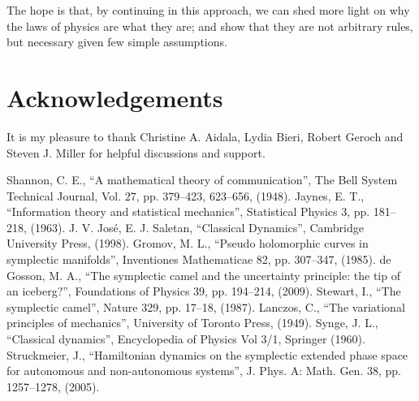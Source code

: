 \documentclass[aps,pra,10pt,twocolumn,floatfix,nofootinbib]{revtex4-1}
\theoremstyle{definition}
\begin{document}
The hope is that, by continuing in this approach, we can shed more light on why the laws of physics are what they are; and show that they are not arbitrary rules, but necessary given few simple assumptions.

\section{Acknowledgements}

It is my pleasure to thank Christine A. Aidala, Lydia Bieri, Robert Geroch and Steven J. Miller for helpful discussions and support.

\begin{thebibliography}{0}

 Shannon, C. E., ``A mathematical theory of communication'', The Bell System Technical Journal, Vol. 27, pp. 379--423, 623--656, (1948).
 Jaynes, E. T., ``Information theory and statistical mechanics'', Statistical Physics 3, pp. 181--218, (1963).
 J. V. Jos\'{e}, E. J. Saletan, ``Classical Dynamics'', Cambridge University Press, (1998).
 Gromov, M. L., ``Pseudo holomorphic curves in symplectic manifolds'', Inventiones Mathematicae 82, pp. 307--347, (1985).
 de Gosson, M. A., ``The symplectic camel and the uncertainty principle: the tip of an iceberg?'', Foundations of Physics 39, pp. 194--214, (2009).
 Stewart, I., ``The symplectic camel'', Nature 329, pp. 17--18, (1987).
 Lanczos, C., ``The variational principles of mechanics'', University of Toronto Press, (1949).
 Synge, J. L., ``Classical dynamics'', Encyclopedia of Physics Vol 3/1, Springer (1960).
 Struckmeier, J., ``Hamiltonian dynamics on the symplectic extended phase space for autonomous and non-autonomous systems'', J. Phys. A: Math. Gen. 38, pp. 1257--1278, (2005).

\end{thebibliography}
\end{document}
